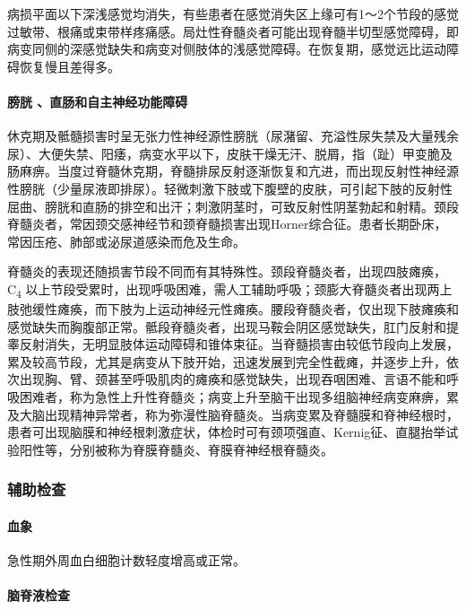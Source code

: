 病损平面以下深浅感觉均消失，有些患者在感觉消失区上缘可有1～2个节段的感觉过敏带、根痛或束带样疼痛感。局灶性脊髓炎者可能出现脊髓半切型感觉障碍，即病变同侧的深感觉缺失和病变对侧肢体的浅感觉障碍。在恢复期，感觉远比运动障碍恢复慢且差得多。

\paragraph{膀胱 、直肠和自主神经功能障碍}

休克期及骶髓损害时呈无张力性神经源性膀胱（尿潴留、充溢性尿失禁及大量残余尿）、大便失禁、阳痿，病变水平以下，皮肤干燥无汗、脱屑，指（趾）甲变脆及肠麻痹。当度过脊髓休克期，脊髓排尿反射逐渐恢复和亢进，而出现反射性神经源性膀胱（少量尿液即排尿）。轻微刺激下肢或下腹壁的皮肤，可引起下肢的反射性屈曲、膀胱和直肠的排空和出汗；刺激阴茎时，可致反射性阴茎勃起和射精。颈段脊髓炎者，常因颈交感神经节和颈脊髓损害出现Horner综合征。患者长期卧床，常因压疮、肺部或泌尿道感染而危及生命。

脊髓炎的表现还随损害节段不同而有其特殊性。颈段脊髓炎者，出现四肢瘫痪，C\textsubscript{4}
以上节段受累时，出现呼吸困难，需人工辅助呼吸；颈膨大脊髓炎者出现两上肢弛缓性瘫痪，而下肢为上运动神经元性瘫痪。腰段脊髓炎者，仅出现下肢瘫痪和感觉缺失而胸腹部正常。骶段脊髓炎者，出现马鞍会阴区感觉缺失，肛门反射和提睾反射消失，无明显肢体运动障碍和锥体束征。当脊髓损害由较低节段向上发展，累及较高节段，尤其是病变从下肢开始，迅速发展到完全性截瘫，并逐步上升，依次出现胸、臂、颈甚至呼吸肌肉的瘫痪和感觉缺失，出现吞咽困难、言语不能和呼吸困难者，称为急性上升性脊髓炎；病变上升至脑干出现多组脑神经病变麻痹，累及大脑出现精神异常者，称为弥漫性脑脊髓炎。当病变累及脊髓膜和脊神经根时，患者可出现脑膜和神经根刺激症状，体检时可有颈项强直、Kernig征、直腿抬举试验阳性等，分别被称为脊膜脊髓炎、脊膜脊神经根脊髓炎。

\subsubsection{辅助检查}

\paragraph{血象}

急性期外周血白细胞计数轻度增高或正常。

\paragraph{脑脊液检查}

